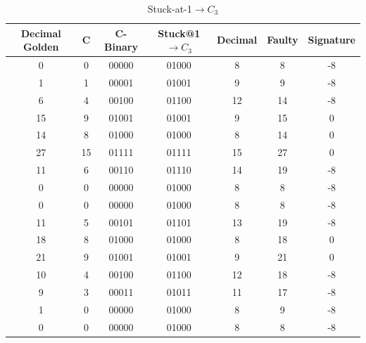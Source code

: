 \begin{table}[tb!]
\center
\caption{Stuck-at-1$\rightarrow C_3$}
\label{firtable2}
\begin{tabular}{|c |c | c | c| c | c| c |} 
 \hline
 \rowcolor{lightgray}
Decimal Golden & C & C-Binary & Stuck@1$\rightarrow C_3$ & Decimal & Faulty &Signature   \\ 
\hline
 
 
 0 & 0 & 00000 & 01000 & 8 & 8 &-8  \\
 \hline

 
  1 & 1 & 00001 & 01001 & 9 & 9 &-8  \\
 \hline
  
   6 & 4 & 00100 & 01100 & 12 & 14 &-8  \\
 \hline


 
  15 & 9 & 01001 & 01001 & 9 &  15 & 0 \\
 \hline
  
    14 & 8 & 01000 & 01000 & 8 &  14 & 0 \\
 \hline

  27 & 15 & 01111& 01111 & 15 &  27 & 0 \\
 \hline
 
  11 & 6 & 00110 & 01110 & 14 &  19 & -8 \\
 \hline
 
  0 & 0 & 00000 & 01000 & 8 &  8 & -8 \\
 \hline
 
  0 & 0 & 00000 & 01000 & 8 &  8 & -8 \\
 \hline
   
  11 & 5 & 00101 & 01101 & 13 &  19 & -8 \\
 \hline
 
  18 & 8 & 01000 & 01000 & 8 &  18 & 0 \\
 \hline
  21 & 9 & 01001 & 01001 & 9 &  21 & 0 \\
 \hline
  10 & 4 & 00100 & 01100 & 12 &  18 & -8 \\
 \hline
  9 & 3 & 00011 & 01011 & 11 &  17 & -8 \\
 \hline
 
  1 & 0 & 00000 & 01000 & 8 &  9 & -8 \\
 \hline
 
  0 & 0 & 00000 & 01000 & 8 &  8 & -8 \\
 \hline
 
 
 
 
 
 
 
 
 
 
 
 
 
 
 
 
 
\end{tabular}
\end{table}













